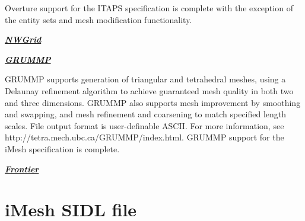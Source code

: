 \documentclass{article}
\begin{document}
Overture support for the ITAPS specification is complete with 
the exception of the entity sets and mesh modification functionality.\newline \newline


\textbf{\emph{{\underline {NWGrid}}}}\newline \newline


\textbf{\emph{{\underline {GRUMMP}}}}


GRUMMP supports generation of triangular and tetrahedral meshes, 
using a Delaunay refinement algorithm to achieve guaranteed mesh 
quality in both two and three dimensions. GRUMMP also supports 
mesh improvement by smoothing and swapping, and mesh refinement 
and coarsening to match specified length scales. File output 
format is user-definable ASCII. For more information, see http://tetra.mech.ubc.ca/GRUMMP/index.html.
GRUMMP support for the iMesh specification is complete.\newline \newline


\textbf{\emph{{\underline {Frontier}}}}

\newpage
\appendix
\section{iMesh SIDL file}
\end{document}
